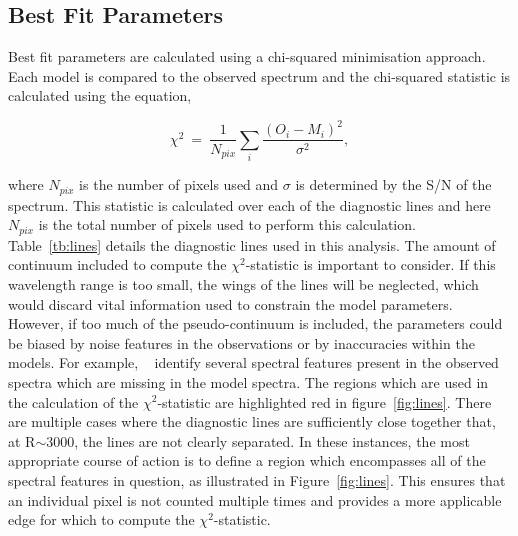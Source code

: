 \subsection{Best Fit Parameters} %
\label{sub:best_fit_parameters}

Best fit parameters are calculated using a chi-squared minimisation approach.
Each model is compared to the observed spectrum
and the chi-squared statistic is calculated using the equation,

\begin{equation}
    \chi^{2}~=~\frac{1}{N_{pix}}\sum\limits_{i}{\frac{(O_{i} - M_{i})^{2}}{\sigma^{2}}},
\end{equation}

where $N_{pix}$ is the number of pixels used and
$\sigma$ is determined by the S/N of the spectrum.
This statistic is calculated over each of the diagnostic lines and here $N_{pix}$ is the total number of pixels used to perform this calculation.
Table~\ref{tb:lines} details the diagnostic lines used in this analysis.
The amount of continuum included to compute the $\chi^{2}$-statistic is important to consider.
If this wavelength range is too small, the wings of the lines will be neglected,
which would discard vital information used to constrain the model parameters.
However, if too much of the pseudo-continuum is included, the parameters could be biased by noise features in the observations or by inaccuracies within the models.
For example,
~\cite{2014PhDT.........G} identify several spectral features present in the observed spectra which are missing in the model spectra.
The regions which are used in the calculation of the $\chi^{2}$-statistic are highlighted red in
figure~\ref{fig:lines}.
There are multiple cases where the diagnostic lines are sufficiently close together that, at R$\sim$3000,
the lines are not clearly separated.
In these instances, the most appropriate course of action is to define a region which encompasses all of the spectral features in question,
as illustrated in Figure~\ref{fig:lines}.
This ensures that an individual pixel is not counted multiple times and provides a more applicable edge for which to compute the $\chi^{2}$-statistic.

